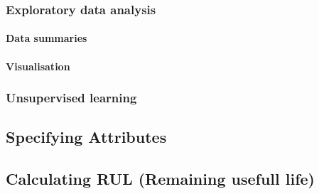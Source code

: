 		\subsubsection{Exploratory data analysis}
			\paragraph{Data summaries}
			\paragraph{Visualisation}
		\subsubsection{Unsupervised learning}
	\subsection{Specifying Attributes}
	\subsection{Calculating RUL (Remaining usefull life)}
	


